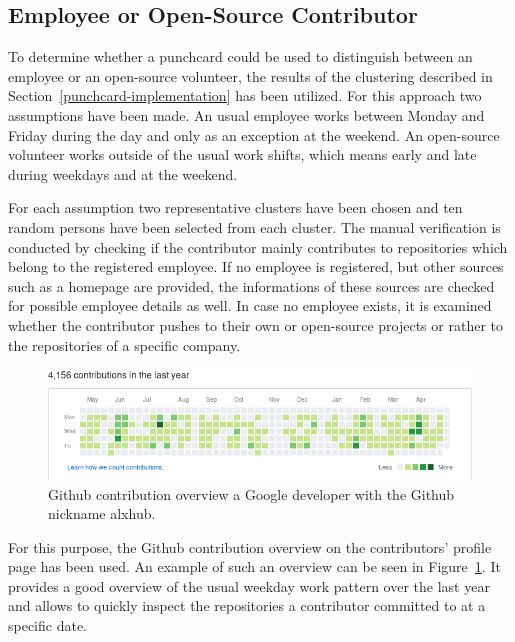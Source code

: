 \subsection{Employee or Open-Source Contributor}
To determine whether a punchcard could be used to distinguish between an employee or an open-source volunteer, the results of the clustering described in Section~\ref{punchcard-implementation} has been utilized.
For this approach two assumptions have been made.
An usual employee works between Monday and Friday during the day and only as an exception at the weekend.
An open-source volunteer works outside of the usual work shifts, which means early and late during weekdays and at the weekend.

For each assumption two representative clusters have been chosen and ten random persons have been selected from each cluster.
The manual verification is conducted by checking if the contributor mainly contributes to repositories which belong to the registered employee.
If no employee is registered, but other sources such as a homepage are provided, the informations of these sources are checked for possible employee details as well.
In case no employee exists, it is examined whether the contributor pushes to their own or open-source projects or rather to the repositories of a specific company.

\begin{figure}[H]
    \includegraphics[scale=0.6]{./graphs/contribution-overview-alxhub}
    \centering
    \caption{Github contribution overview a Google developer with the Github nickname alxhub.}\label{fig:github-contribution-overview}
\end{figure}

For this purpose, the Github contribution overview on the contributors' profile page has been used.
An example of such an overview can be seen in Figure~\ref{fig:github-contribution-overview}.
It provides a good overview of the usual weekday work pattern over the last year and allows to quickly inspect the repositories a contributor committed to at a specific date.

